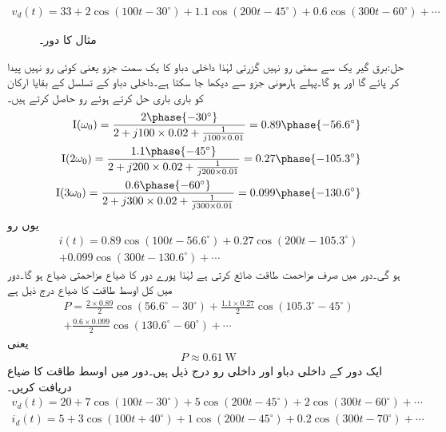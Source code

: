 \begin{align*}
v_d(t)=33+2\cos(100t-30^{\circ})+1.1\cos(200t-45^{\circ})+0.6\cos(300t-60^{\circ})+\cdots
\end{align*}
%
\begin{figure}
\centering
{}
\caption{مثال  کا دور۔}
\label{شکل_فوریئر_اوسط_طاقت_الف}
\end{figure}

حل:برق گیر یک سے سمتی رو نہیں گزرتی لہٰذا داخلی دباو کا یک سمت جزو یعنی  کوئی رو نہیں پیدا کر پائے گا اور  ہو گا۔پہلے ہارمونی جزو سے  دیکھا جا سکتا ہے۔داخلی دباو کے تسلسل کے بقایا ارکان کو باری باری حل کرتے  ہوئے رو حاصل کرتے ہیں۔
\begin{align*}
\bI(\omega_0)=\frac{2\phase{-30^{\circ}}}{2+j100\times 0.02+\frac{1}{j100\times 0.01}}=0.89\phase{-56.6^{\circ}}\\
\bI(2\omega_0)=\frac{1.1\phase{-45^{\circ}}}{2+j200\times 0.02+\frac{1}{j200\times 0.01}}=0.27\phase{-105.3^{\circ}}\\
\bI(3\omega_0)=\frac{0.6\phase{-60^{\circ}}}{2+j300\times 0.02+\frac{1}{j300\times 0.01}}=0.099\phase{-130.6^{\circ}}
\end{align*}
یوں رو
\begin{multline*}
i(t)=0.89\cos(100t-56.6^{\circ})+0.27\cos(200t-105.3^{\circ})\\
+0.099\cos(300t-130.6^{\circ})+\cdots
\end{multline*}
ہو گی۔دور میں صرف مزاحمت طاقت ضائع کرتی ہے لہٰذا پورے دور کا ضیاع مزاحمتی ضیاع ہو گا۔دور میں کل اوسط طاقت کا ضیاع درج ذیل ہے
\begin{multline*}
P=\frac{2\times 0.89}{2}\cos(56.6^{\circ}-30^{\circ})+\frac{1.1\times 0.27}{2}\cos(105.3^{\circ}-45^{\circ})\\
+\frac{0.6\times 0.099}{2}\cos(130.6^{\circ}-60^{\circ})+\cdots
\end{multline*}
یعنی
\begin{align*}
P\approx\SI{0.61}{\watt}
\end{align*}
ایک دور کے داخلی دباو اور داخلی رو درج ذیل ہیں۔دور میں اوسط طاقت کا ضیاع دریافت کریں۔
\begin{align*}
v_d(t)=20+7\cos(100t-30^{\circ})+5\cos(200t-45^{\circ})+2\cos(300t-60^{\circ})+\cdots\\
i_d(t)=5+3\cos(100t+40^{\circ})+1\cos(200t-45^{\circ})+0.2\cos(300t-70^{\circ})+\cdots
\end{align*}

